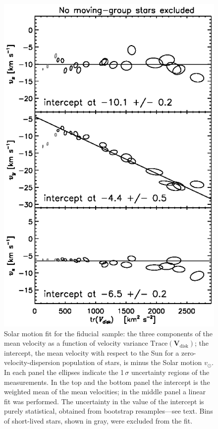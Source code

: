\documentclass[12pt,preprint]{aastex}
\newcommand{\ten}[1]{\mathbf{#1}} %
\newcommand{\VV}{\ten{V}}
\newcommand{\trace}{\mathrm{Trace}}
\newcommand{\vsunlsr}{\ensuremath{v_\odot}}
\newcommand{\VVdisk}{\VV_{\mathrm{\!disk}}}
\newcommand{\fiducial}{fiducial}
\begin{document}
\clearpage
\begin{figure}
\includegraphics[]{lsr_dropblue_groupcut1.1.ps}
\caption{Solar motion fit for the \fiducial\ sample: the three
 components of the mean velocity as a function of velocity variance
 $\trace(\VVdisk)$; the intercept, the mean velocity with respect to
 the Sun for a zero-velocity-dispersion population of stars, is minus
 the Solar motion \vsunlsr.  In each panel the ellipses indicate the
 1\,$\sigma$ uncertainty regions of the measurements.  In the top and
 the bottom panel the intercept is the weighted mean of the mean
 velocities; in the middle panel a linear fit was performed.  The
 uncertainty in the value of the intercept is purely statistical,
 obtained from bootstrap resamples---see text.  Bins of short-lived
 stars, shown in gray, were excluded from the fit.}\label{fig:ex1.1}
\end{figure}
\end{document}
